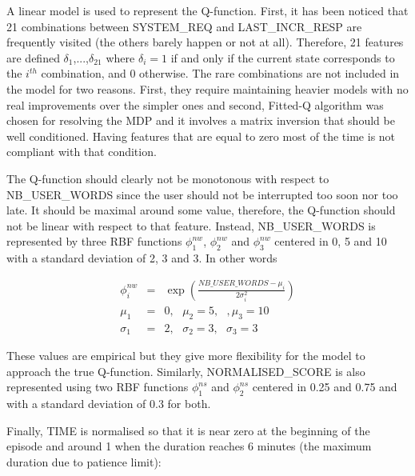         A linear model is used to represent the Q-function. First, it has been noticed that 21 combinations between SYSTEM\_REQ and LAST\_INCR\_RESP are frequently visited (the others barely happen or not at all). Therefore, 21 features are defined $\delta_1$,...,$\delta_{21}$ where $\delta_i = 1$ if and only if the current state corresponds to the $i^{th}$ combination, and 0 otherwise. The rare combinations are not included in the model for two reasons. First, they require maintaining heavier models with no real improvements over the simpler ones and second, Fitted-Q algorithm was chosen for resolving the MDP and it involves a matrix inversion that should be well conditioned. Having features that are equal to zero most of the time is not compliant with that condition.
        
        The Q-function should clearly not be monotonous with respect to NB\_USER\_WORDS since the user should not be interrupted too soon nor too late. It should be maximal around some value, therefore, the Q-function should not be linear with respect to that feature. Instead, NB\_USER\_WORDS is represented by three RBF functions $\phi^{nw}_1$, $\phi^{nw}_2$ and $\phi^{nw}_3$ centered in 0, 5 and 10 with a standard deviation of 2, 3 and 3. In other words
        
				\begin{eqnarray}
					\phi^{nw}_i & = & \exp (\frac{NB\_USER\_WORDS - \mu_i}{2 \sigma_i^2}) \\
          \mu_1 & = & 0, \text{ } \mu_2 = 5, \text{ }, \mu_3 = 10 \nonumber \\
          \sigma_1 & = & 2, \text{ } \sigma_2 = 3, \text{ } \sigma_3 = 3 \nonumber
				\end{eqnarray}
            
      	These values are empirical but they give more flexibility for the model to approach the true Q-function. Similarly, NORMALISED\_SCORE is also represented using two RBF functions $\phi^{ns}_1$ and $\phi^{ns}_2$ centered in 0.25 and 0.75 and with a standard deviation of 0.3 for both.
        
        Finally, TIME is normalised so that it is near zero at the beginning of the episode and around 1 when the duration reaches 6 minutes (the maximum duration due to patience limit):
        
